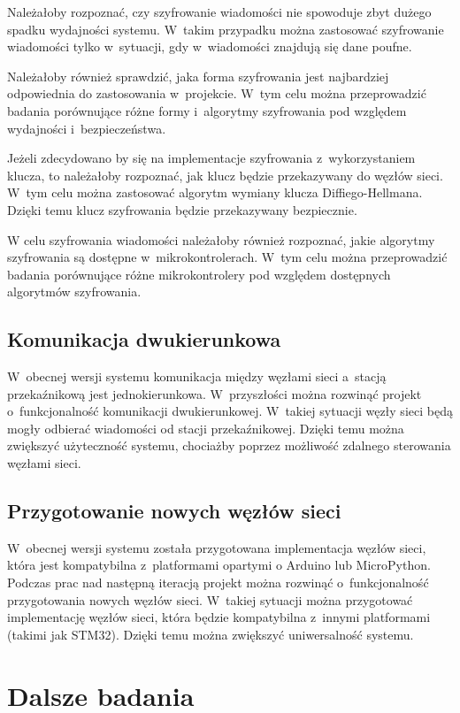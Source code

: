 Należałoby rozpoznać, czy szyfrowanie wiadomości nie spowoduje zbyt dużego spadku wydajności systemu.
W~takim przypadku można zastosować szyfrowanie wiadomości tylko w~sytuacji, gdy w~wiadomości znajdują się dane poufne.

Należałoby również sprawdzić, jaka forma szyfrowania jest najbardziej odpowiednia do zastosowania w~projekcie.
W~tym celu można przeprowadzić badania porównujące różne formy i~algorytmy szyfrowania pod względem wydajności i~bezpieczeństwa.

Jeżeli zdecydowano by się na implementacje szyfrowania z~wykorzystaniem klucza, to należałoby rozpoznać, jak klucz będzie przekazywany do węzłów sieci.
W~tym celu można zastosować algorytm wymiany klucza Diffiego-Hellmana.
Dzięki temu klucz szyfrowania będzie przekazywany bezpiecznie.

W celu szyfrowania wiadomości należałoby również rozpoznać, jakie algorytmy szyfrowania są dostępne w~mikrokontrolerach.
W~tym celu można przeprowadzić badania porównujące różne mikrokontrolery pod względem dostępnych algorytmów szyfrowania.

\subsection{Komunikacja dwukierunkowa}
W~obecnej wersji systemu komunikacja między węzłami sieci a~stacją przekaźnikową jest jednokierunkowa.
W~przyszłości można rozwinąć projekt o~funkcjonalność komunikacji dwukierunkowej.
W~takiej sytuacji węzły sieci będą mogły odbierać wiadomości od stacji przekaźnikowej.
Dzięki temu można zwiększyć użyteczność systemu, chociażby poprzez możliwość zdalnego sterowania węzłami sieci.
\subsection{Przygotowanie nowych węzłów sieci}
W~obecnej wersji systemu została przygotowana implementacja węzłów sieci, która jest kompatybilna z~platformami opartymi o Arduino lub MicroPython.
Podczas prac nad następną iteracją projekt można rozwinąć o~funkcjonalność przygotowania nowych węzłów sieci.
W~takiej sytuacji można przygotować implementację węzłów sieci, która będzie kompatybilna z~innymi platformami (takimi jak STM32).
Dzięki temu można zwiększyć uniwersalność systemu.

\section{Dalsze badania}

